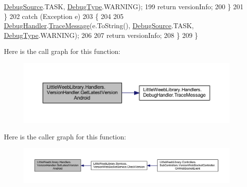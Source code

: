 \begin{DoxyCode}
      \mbox{\hyperlink{namespace_little_weeb_library_1_1_handlers_a2a6ca0775121c9c503d58aa254d292be}{DebugSource}}.TASK, \mbox{\hyperlink{namespace_little_weeb_library_1_1_handlers_ab66019ed40462876ec4e61bb3ccb0a62}{DebugType}}.WARNING);
199                     \textcolor{keywordflow}{return} versionInfo;
200                 \}
201             \}
202             \textcolor{keywordflow}{catch} (Exception e)
203             \{
204 
205                 \mbox{\hyperlink{class_little_weeb_library_1_1_handlers_1_1_version_handler_a9d4e181ca6b1efff96f530dd7981d6e3}{DebugHandler}}.\mbox{\hyperlink{interface_little_weeb_library_1_1_handlers_1_1_i_debug_handler_a2e405bc3492e683cd3702fae125221bc}{TraceMessage}}(e.ToString(), 
      \mbox{\hyperlink{namespace_little_weeb_library_1_1_handlers_a2a6ca0775121c9c503d58aa254d292be}{DebugSource}}.TASK, \mbox{\hyperlink{namespace_little_weeb_library_1_1_handlers_ab66019ed40462876ec4e61bb3ccb0a62}{DebugType}}.WARNING);
206 
207                 \textcolor{keywordflow}{return} versionInfo;
208             \}
209         \}
\end{DoxyCode}
Here is the call graph for this function\+:\nopagebreak
\begin{figure}[H]
\begin{center}
\leavevmode
\includegraphics[width=350pt]{class_little_weeb_library_1_1_handlers_1_1_version_handler_a4021041fcc24a7f9489060c598222891_cgraph}
\end{center}
\end{figure}
Here is the caller graph for this function\+:\nopagebreak
\begin{figure}[H]
\begin{center}
\leavevmode
\includegraphics[width=350pt]{class_little_weeb_library_1_1_handlers_1_1_version_handler_a4021041fcc24a7f9489060c598222891_icgraph}
\end{center}
\end{figure}
\mbox{\label{class_little_weeb_library_1_1_handlers_1_1_version_handler_ac2510dcad764a9c925d8da152740f095}} 
